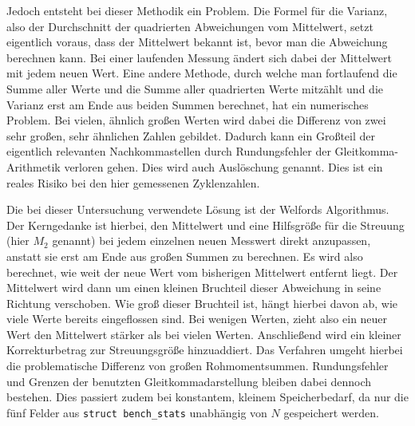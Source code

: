 Jedoch entsteht bei dieser Methodik ein Problem. Die Formel f{\"u}r die Varianz, also der Durchschnitt der quadrierten Abweichungen vom Mittelwert, setzt eigentlich voraus, dass der Mittelwert bekannt ist, bevor man die Abweichung berechnen kann. Bei einer laufenden Messung {\"a}ndert sich dabei der Mittelwert mit jedem neuen Wert. Eine andere Methode, durch welche man fortlaufend die Summe aller Werte und die Summe aller quadrierten Werte mitz{\"a}hlt und die Varianz erst am Ende aus beiden Summen berechnet, hat ein numerisches Problem. Bei vielen, {\"a}hnlich gro{\ss}en Werten wird dabei die Differenz von zwei sehr gro{\ss}en, sehr {\"a}hnlichen Zahlen gebildet. Dadurch kann ein Gro{\ss}teil der eigentlich relevanten Nachkommastellen durch Rundungsfehler der Gleitkomma-Arithmetik verloren gehen. Dies wird auch \glqq{}Ausl{\"o}schung\grqq{} genannt. Dies ist ein reales Risiko bei den hier gemessenen Zyklenzahlen.

Die bei dieser Untersuchung verwendete L{\"o}sung ist der Welfords Algorithmus. Der Kerngedanke ist hierbei, den Mittelwert und eine Hilfsgr{\"o}{\ss}e f{\"u}r die Streuung (hier \(M_2\) genannt) bei jedem einzelnen neuen Messwert direkt anzupassen, anstatt sie erst am Ende aus gro{\ss}en Summen zu berechnen. Es wird also berechnet, wie weit der neue Wert vom bisherigen Mittelwert entfernt liegt. Der Mittelwert wird dann um einen kleinen Bruchteil dieser Abweichung in seine Richtung verschoben. Wie gro{\ss} dieser Bruchteil ist, h{\"a}ngt hierbei davon ab, wie viele Werte bereits eingeflossen sind. Bei wenigen Werten, zieht also ein neuer Wert den Mittelwert st{\"a}rker als bei vielen Werten. Anschlie{\ss}end wird ein kleiner Korrekturbetrag zur Streuungsgr{\"o}{\ss}e hinzuaddiert. Das Verfahren umgeht hierbei die problematische Differenz von gro{\ss}en Rohmomentsummen. Rundungsfehler und Grenzen der benutzten Gleitkommadarstellung bleiben dabei dennoch bestehen. Dies passiert zudem bei konstantem, kleinem Speicherbedarf, da nur die f{\"u}nf Felder aus \lstinline[style=fileinline]|struct bench_stats| unabh{\"a}ngig von \(N\) gespeichert werden.

